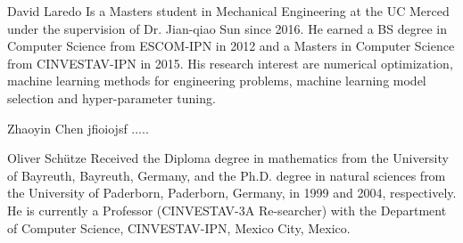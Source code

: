 
\begin{biography}{David Laredo}
Is a Masters student in Mechanical Engineering at the UC Merced under the supervision of Dr. Jian-qiao Sun since 2016. He earned a BS degree in Computer Science from ESCOM-IPN in 2012 and a Masters in Computer Science from CINVESTAV-IPN in 2015. His research interest are numerical optimization, machine learning methods for engineering problems, machine learning model selection and hyper-parameter tuning.
\end{biography}

\begin{biography}{Zhaoyin Chen}
jfioiojsf .....
\end{biography}

\begin{biography}{Oliver Sch\"utze}
Received the Diploma degree in mathematics from the University of Bayreuth, Bayreuth, Germany, and the Ph.D. degree in natural sciences from the University of Paderborn, Paderborn, Germany, in 1999 and 2004, respectively.
He is currently a Professor (CINVESTAV-3A Re-searcher) with the Department of Computer Science, CINVESTAV-IPN, Mexico City, Mexico.
\end{biography}


